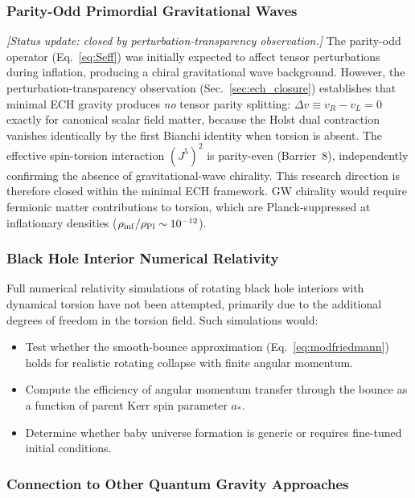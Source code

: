 \documentclass[aps,prd,twocolumn,superscriptaddress,showpacs,preprintnumbers,nofootinbib,longbibliography,floatfix]{revtex4-2}
\begin{document}
\subsubsection{Parity-Odd Primordial Gravitational Waves}

\textit{[Status update: closed by perturbation-transparency observation.]} The parity-odd operator (Eq.~\ref{eq:Seff}) was initially expected to affect tensor perturbations during inflation, producing a chiral gravitational wave background. However, the perturbation-transparency observation (Sec.~\ref{sec:ech_closure}) establishes that minimal ECH gravity produces \emph{no} tensor parity splitting: $\Delta v \equiv v_R - v_L = 0$ exactly for canonical scalar field matter, because the Holst dual contraction vanishes identically by the first Bianchi identity when torsion is absent. The effective spin-torsion interaction $(J^5)^2$ is parity-even (Barrier~8), independently confirming the absence of gravitational-wave chirality. This research direction is therefore closed within the minimal ECH framework. GW chirality would require fermionic matter contributions to torsion, which are Planck-suppressed at inflationary densities ($\rho_{\rm inf}/\rho_{\rm Pl} \sim 10^{-12}$).

\subsubsection{Black Hole Interior Numerical Relativity}

Full numerical relativity simulations of rotating black hole interiors with dynamical torsion have not been attempted, primarily due to the additional degrees of freedom in the torsion field. Such simulations would:

\begin{itemize}[leftmargin=*]
\item Test whether the smooth-bounce approximation (Eq.~\ref{eq:modfriedmann}) holds for realistic rotating collapse with finite angular momentum.
\item Compute the efficiency of angular momentum transfer through the bounce as a function of parent Kerr spin parameter $a_*$.
\item Determine whether baby universe formation is generic or requires fine-tuned initial conditions.
\end{itemize}

\subsubsection{Connection to Other Quantum Gravity Approaches}
\end{document}
